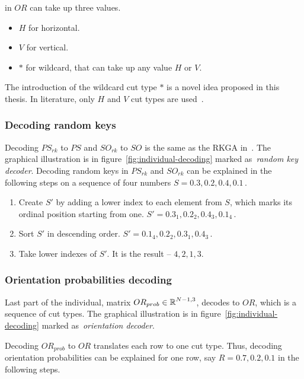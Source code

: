 in $OR$  can take up three values.
\begin{itemize}
    \item $H$ for horizontal.
    \item $V$ for vertical.
    \item $*$ for wildcard, that can take up any value $H$ or $V$.
\end{itemize}

The introduction of the wildcard cut type $*$ is a novel idea proposed in this thesis.
In literature, only $H$ and $V$ cut types are used~\cite{friedrichIntegratedSlicingTree2018, changSlicingTreeRepresentation2013, liuMultiimprovedGeneticAlgorithm2012, hwangGeneticAlgorithmApproach2009}.

\subsubsection*{Decoding random keys}

Decoding $PS_{rk}$ to $PS$ and $SO_{rk}$ to $SO$ is the same as the RKGA in~\cite{beanGeneticAlgorithmsRandom1994}.
The graphical illustration is in figure~\ref{fig:individual-decoding} marked as~\textit{random key decoder}.
Decoding random keys in $PS_{rk}$ and  $SO_{rk}$ can be explained in the following steps on a sequence of four numbers $S = 0.3, 0.2, 0.4, 0.1$\,.

\begin{enumerate}
    \item Create $S'$ by adding a lower index to each element from $S$, which marks its ordinal position starting from one.
    $S' = 0.3_1, 0.2_2, 0.4_3, 0.1_4$\,.
    \item Sort $S'$ in descending order. $S' = 0.1_4, 0.2_2,  0.3_1, 0.4_3$\,.
    \item Take lower indexes of $S'$.
    It is the result – $4, 2, 1, 3$.
\end{enumerate}


\subsubsection*{Orientation probabilities decoding}

Last part of the individual, matrix $OR_{prob} \in \operatorname*{\mathbb{R}}^{N-1, 3}$, decodes to $OR$, which is a sequence of cut types.
The graphical illustration is in figure~\ref{fig:individual-decoding} marked as~\textit{orientation decoder}.

Decoding $OR_{prob}$ to $OR$ translates each row to one cut type.
Thus, decoding orientation probabilities can be explained for one row, say $R = 0.7, 0.2, 0.1$
in the following steps.


